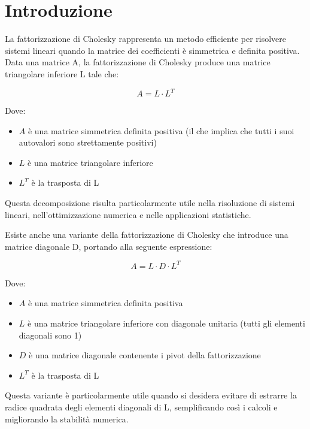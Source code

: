 \chapter{Introduzione}

La fattorizzazione di Cholesky rappresenta un metodo efficiente per risolvere sistemi lineari quando la matrice dei coefficienti 
è simmetrica e definita positiva. Data una matrice A, la fattorizzazione di Cholesky produce una matrice triangolare inferiore L tale che:

$$A = L \cdot L^T$$

Dove:
\begin{itemize}
    \item $A$ è una matrice simmetrica definita positiva (il che implica che tutti i suoi autovalori sono strettamente positivi)
    \item $L$ è una matrice triangolare inferiore
    \item $L^T$ è la trasposta di L
\end{itemize}
Questa decomposizione risulta particolarmente utile nella risoluzione di sistemi lineari, nell'ottimizzazione 
numerica e nelle applicazioni statistiche.

Esiste anche una variante della fattorizzazione di Cholesky che introduce una matrice diagonale D, portando alla seguente
espressione:

$$A = L \cdot D \cdot L^T$$

Dove:
\begin{itemize}
    \item $A$ è una matrice simmetrica definita positiva
    \item $L$ è una matrice triangolare inferiore con diagonale unitaria (tutti gli elementi diagonali sono 1)
    \item $D$ è una matrice diagonale contenente i pivot della fattorizzazione
    \item $L^T$ è la trasposta di L
\end{itemize}
Questa variante è particolarmente utile quando si desidera evitare di estrarre la radice quadrata degli elementi diagonali
di L, semplificando così i calcoli e migliorando la stabilità numerica.


